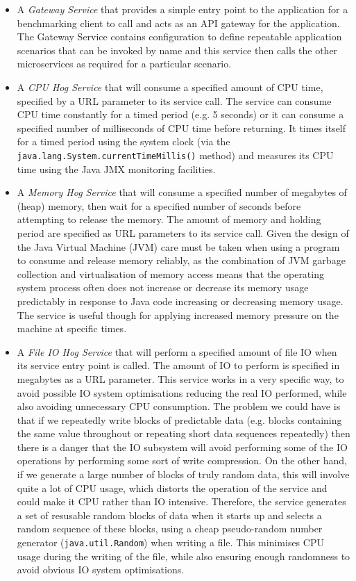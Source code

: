 \begin{itemize}
	\item A \emph{Gateway Service} that provides a simple entry point to the application for a benchmarking client to call and acts as an API gateway \cite{amundsen2016-uservices} for the application.  The Gateway Service contains configuration to define repeatable application scenarios that can be invoked by name and this service then calls the other microservices as required for a particular scenario.
	\item A \emph{CPU Hog Service} that will consume a specified amount of CPU time, specified by a URL parameter to its service call.  The service can consume CPU time constantly for a timed period (e.g. 5 seconds) or it can consume a specified number of milliseconds of CPU time before returning.  It times itself for a timed period using the system clock (via the \texttt{java.lang.System.currentTimeMillis()} method) and measures its CPU time using the Java JMX monitoring facilities.
	\item A \emph{Memory Hog Service} that will consume a specified number of megabytes of (heap) memory, then wait for a specified number of seconds before attempting to release the memory.  The amount of memory and holding period are specified as URL parameters to its service call.  Given the design of the Java Virtual Machine (JVM) care must be taken when using a program to consume and release memory reliably, as the combination of JVM garbage collection and virtualisation of memory access means that the operating system process often does not increase or decrease its memory usage predictably in response to Java code increasing or decreasing memory usage.  The service is useful though for applying increased memory pressure on the machine at specific times.
	\item A \emph{File IO Hog Service} that will perform a specified amount of file IO when its service entry point is called.  The amount of IO to perform is specified in megabytes as a URL parameter.  This service works in a very specific way, to avoid possible IO system optimisations reducing the real IO performed, while also avoiding unnecessary CPU consumption.  The problem we could have is that if we repeatedly write blocks of predictable data (e.g. blocks containing the same value throughout or repeating short data sequences repeatedly) then there is a danger that the IO subsystem will avoid performing some of the IO operations by performing some sort of write compression.  On the other hand, if we generate a large number of blocks of truly random data, this will involve quite a lot of CPU usage, which distorts the operation of the service and could make it CPU rather than IO intensive.  Therefore, the service generates a set of resusable random blocks of data when it starts up and selects a random sequence of these blocks, using a cheap pseudo-random number generator (\texttt{java.util.Random}) when writing a file.  This minimises CPU usage during the writing of the file, while also ensuring enough randomness to avoid obvious IO system optimisations.
 \end{itemize}

